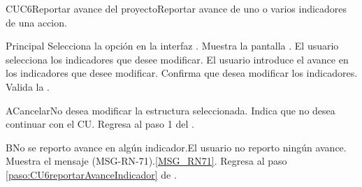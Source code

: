 
	\begin{UseCase}{CUC6}{Reportar avance del proyecto}{Reportar avance de uno o varios indicadores de una accion.}
	\end{UseCase}

	\begin{UCtrayectoria}{Principal}
		\UCpaso[\UCactor] Selecciona la opción  en la interfaz .
		\UCpaso Muestra la pantalla  \label{paso:CU6reportarAvanceIndicador}. 
		\UCpaso[\UCactor] El usuario selecciona los indicadores que desee modificar. 
		\UCpaso[\UCactor] El usuario introduce el avance en los indicadores que desee modificar. 
		\UCpaso Confirma que desea modificar los indicadores. 
		\UCpaso Valida la . 
	\end{UCtrayectoria}

	\begin{UCtrayectoriaA}{A}{Cancelar}{No desea modificar la estructura seleccionada.}
		\UCpaso[\UCactor] Indica que no desea continuar con el CU.
		\UCpaso Regresa al paso 1 del .
	\end{UCtrayectoriaA}

	\begin{UCtrayectoriaA}{B}{No se reporto avance en algún indicador.}{El usuario no reporto ningún avance.}
		\UCpaso Muestra el mensaje (MSG-RN-71).\ref{MSG_RN71}.
		\UCpaso Regresa al paso \ref{paso:CU6reportarAvanceIndicador} de . 
	\end{UCtrayectoriaA}

